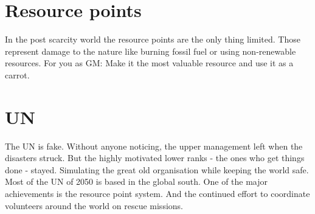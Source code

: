 \section{Resource points}
\label{sec:Resource Points}
In the post scarcity world the resource points are the only thing limited. Those represent damage to the nature like burning fossil fuel or using non-renewable resources. For you as GM: Make it the most valuable resource and use it as a carrot.

\section{UN}
\label{sec:UN}
The UN is fake. Without anyone noticing, the upper management left when the disasters struck. But the highly motivated lower ranks - the ones who get things done - stayed. Simulating the great old organisation while keeping the world safe. Most of the UN of 2050 is based in the global south. One of the major achievements is the resource point system. And the continued effort to coordinate volunteers around the world on rescue missions.